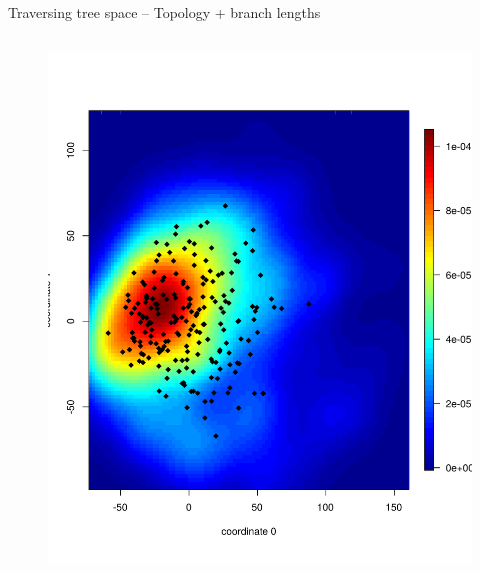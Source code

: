 \documentclass[newPxFont,numfooter,sectionpages]{beamer}
\begin{document}
\begin{frame}{Traversing tree space -- Topology + branch lengths}
\begin{column}{0.5\textwidth}
\begin{center}
\begin{figure}
	\includegraphics[width=\textwidth]{figures/mds_BHV_STL_denv4.pdf}
\end{figure}
 \end{center}

\end{column}
\end{frame}
\end{document}
